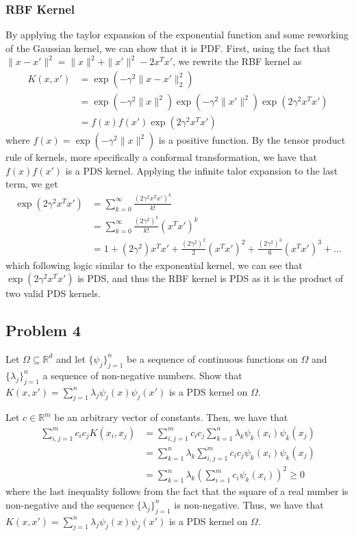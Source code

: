 \documentclass[12pt]{article}
\begin{document}
\subsubsection*{RBF Kernel}
By applying the taylor expansion of the exponential function and some reworking of the Gaussian kernel,
we can show that it is PDF. First, using the fact that $\|x-x'\|^2 = \|x\|^2 + \|x'\|^2 - 2x^Tx'$, 
we rewrite the RBF kernel as
\begin{align*}
    K(x,x') &= \exp(-\gamma^2\|x-x'\|_2^2) \\
    &= \exp{(-\gamma^2 \|x\|^2)} \exp{(-\gamma^2 \|x'\|^2)} \exp{(2\gamma^2 x^Tx')} \\ 
    &= f(x)f(x')\exp{(2\gamma^2 x^Tx')}
\end{align*}
where $f(x)=\exp{(-\gamma^2 \|x\|^2)}$ is a positive function. By the tensor product rule of kernels, more specifically a 
conformal transformation, we have that $f(x)f(x')$ is a PDS kernel.
Applying the infinite talor expansion to the last term, we get
\begin{align*}
    \exp{(2\gamma^2 x^Tx')} &= \sum_{k=0}^\infty \frac{(2\gamma^2 x^Tx')^k}{k!} \\
    &= \sum_{k=0}^\infty \frac{(2\gamma^2)^k}{k!}(x^Tx')^k \\
    &= 1 + (2\gamma^2) x^Tx' + \frac{(2\gamma^2)^2}{2}(x^Tx')^2 + \frac{(2\gamma^2)^3}{6}(x^Tx')^3 + \dots
\end{align*}
which following logic similar to the exponential kernel, we can see that $\exp{(2\gamma^2 x^Tx')}$ is PDS,
and thus the RBF kernel is PDS as it is the product of two valid PDS kernels.


\subsection*{Problem 4} %
\begin{mdframed}
    Let $\Omega \subseteq \mathbb{R}^{d}$ and let $\{\psi_j\}_{j=1}^n$ be a sequence of continuous 
    functions on $\Omega$ and $\{\lambda_j\}_{j=1}^n$ a sequence of non-negative numbers. Show that 
    $K(x,x')=\sum_{j=1}^n \lambda_j\psi_j(x)\psi_j(x')$ is a PDS kernel on $\Omega$.
\end{mdframed}
Let $c \in \mathbb{R}^m$ be an arbitrary vector of constants. Then, we have that
\begin{align*}
    \sum_{i,j=1}^m c_i c_j K(x_i, x_j) &= \sum_{i,j=1}^m c_i c_j \sum_{k=1}^n \lambda_k \psi_k(x_i)\psi_k(x_j) \\
    &= \sum_{k=1}^n \lambda_k \sum_{i,j=1}^m c_i c_j \psi_k(x_i)\psi_k(x_j) \\
    &= \sum_{k=1}^n \lambda_k \left(\sum_{i=1}^m c_i \psi_k(x_i)\right)^2 \geq 0
\end{align*}
where the last inequality follows from the fact that the square of a real number is non-negative and
the sequence $\{\lambda_j\}_{j=1}^n$ is non-negative. Thus, we have that 
$K(x,x')=\sum_{j=1}^n \lambda_j\psi_j(x)\psi_j(x')$ is a PDS kernel on $\Omega$.
\end{document}
